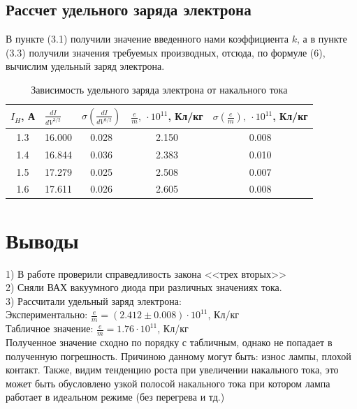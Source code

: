 \documentclass[a4paper, 12pt]{article}%
\begin{document}
	\subsection{Рассчет удельного заряда электрона}
	В пункте (3.1) получили значение введенного нами коэффициента $k$, а в пункте (3.3) получили значения требуемых производных, отсюда, по формуле (6), вычислим удельный заряд электрона.
	\begin{table}[H]
		\centering
		\begin{tabular}{|c|c|c|c|c|}
			\hline
			\multicolumn{1}{|l|}{$I_H$, А} & \multicolumn{1}{l|}{$\frac{dI}{dV^{3/2}}$} & \multicolumn{1}{l|}{$\sigma(\frac{dI}{dV^{3/2}})$} & \multicolumn{1}{l|}{$\frac{e}{m}, ~\cdot10^{11}$, Кл/кг} & \multicolumn{1}{l|}{$\sigma(\frac{e}{m}), ~\cdot10^{11}$, Кл/кг} \\ \hline
			1.3                       & 16.000                     & 0.028                  & 2.150                  & 0.008                  \\ \hline
			1.4                       & 16.844                     & 0.036                  & 2.383                  & 0.010                  \\ \hline
			1.5                       & 17.279                     & 0.025                  & 2.508                  & 0.007                  \\ \hline
			1.6                       & 17.611                     & 0.026                  & 2.605                  & 0.008                  \\ \hline
		\end{tabular}
		\caption{Зависимость удельного заряда электрона от накального тока}
	\end{table}
	\section{Выводы}
	1) В работе проверили справедливость закона <<трех вторых>>\\
	2) Сняли ВАХ вакуумного диода при различных значениях тока.\\
	3) Рассчитали удельный заряд электрона:\\
	Экспериментально: $\frac{e}{m} = (2.412 \pm 0.008) \cdot 10^{11}$, Кл/кг\\
	Табличное значение: $\frac{e}{m} = 1.76 \cdot 10^{11}$, Кл/кг\\
	Полученное значение сходно по порядку с табличным, однако не попадает в полученную погрешность. Причиною данному могут быть: износ лампы, плохой контакт. Также, видим тенденцию роста при увеличении накального тока, это может быть обусловлено узкой полосой накального тока при котором лампа работает в идеальном режиме (без перегрева и тд.)
\end{document}
